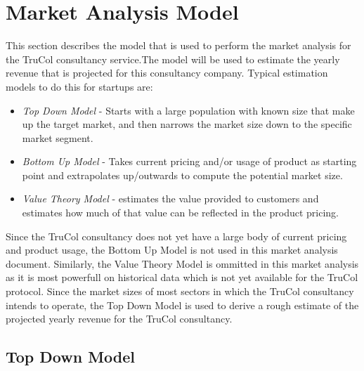 \section{Market Analysis Model}\label{sec:market_analysis_model}
This section describes the model that is used to perform the market analysis for the TruCol consultancy service.The model will be used to estimate the yearly revenue that is projected for this consultancy company. Typical estimation models to do this for startups are:
\begin{itemize}
	\item \textit{Top Down Model} - Starts with a large population with known size that make up the target market, and then narrows the market size down to the specific market segment.
	\item \textit{Bottom Up Model} - Takes current pricing and/or usage of product as starting point and extrapolates up/outwards to compute the potential market size.
	\item \textit{Value Theory Model} - estimates the value provided to customers and estimates how much of that value can be reflected in the product pricing.
\end{itemize}

\noindent Since the TruCol consultancy does not yet have a large body of current pricing and product usage, the Bottom Up Model is not used in this market analysis document. Similarly, the Value Theory Model is ommitted in this market analysis as it is most powerfull on historical data which is not yet available for the TruCol protocol. Since the market sizes of most sectors in which the TruCol consultancy intends to operate, the Top Down Model is used to derive a rough estimate of the projected yearly revenue for the TruCol consultancy.

\subsection{Top Down Model}\label{subsec:results_top_down}